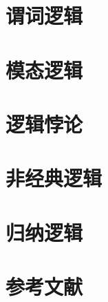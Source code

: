 \chapter{谓词逻辑}







\chapter{模态逻辑}




\chapter{逻辑悖论}




\chapter{非经典逻辑}








\chapter{归纳逻辑}








\backmatter
\chapter*{参考文献}
\printbibliography


